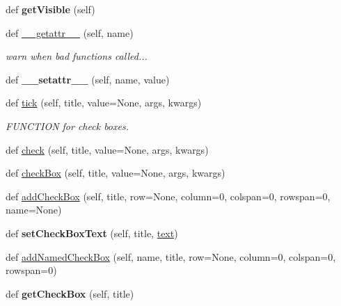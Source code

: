 \begin{DoxyCompactItemize}
def {\bfseries get\+Visible} (self)
\item 
\mbox{\label{classappjar_1_1gui_a11530a350a0664459ecfd79232dd0b71}} 
def \hyperlink{classappjar_1_1gui_a11530a350a0664459ecfd79232dd0b71}{\+\_\+\+\_\+getattr\+\_\+\+\_\+} (self, name)
\begin{DoxyCompactList}\small\item\em warn when bad functions called... \end{DoxyCompactList}\item 
\mbox{\label{classappjar_1_1gui_a2d578292be8d14f1d11415e1548fec39}} 
def {\bfseries \+\_\+\+\_\+setattr\+\_\+\+\_\+} (self, name, value)
\item 
def \hyperlink{classappjar_1_1gui_ab98fbb5e6c2e23f49a2b6d02927fb347}{tick} (self, title, value=None, args, kwargs)
\begin{DoxyCompactList}\small\item\em F\+U\+N\+C\+T\+I\+ON for check boxes. \end{DoxyCompactList}\item 
def \hyperlink{classappjar_1_1gui_a19ebba5d0f738981a6d3210a88d20dbc}{check} (self, title, value=None, args, kwargs)
\item 
def \hyperlink{classappjar_1_1gui_a88b585699e7e9d95175900d31961112d}{check\+Box} (self, title, value=None, args, kwargs)
\item 
def \hyperlink{classappjar_1_1gui_a65dadc504c218227cf826fccaa795b89}{add\+Check\+Box} (self, title, row=None, column=0, colspan=0, rowspan=0, name=None)
\item 
\mbox{\label{classappjar_1_1gui_a0a94a7366ee08f746bfc0ee79fa28414}} 
def {\bfseries set\+Check\+Box\+Text} (self, title, \hyperlink{classappjar_1_1gui_a221b516425bf76dd8560ec9f4818182f}{text})
\item 
def \hyperlink{classappjar_1_1gui_ac86a2fb6536349361c989bb826df2a57}{add\+Named\+Check\+Box} (self, name, title, row=None, column=0, colspan=0, rowspan=0)
\item 
\mbox{\label{classappjar_1_1gui_a1c08bb4ed7a20a9a540ac7ce370eb236}} 
def {\bfseries get\+Check\+Box} (self, title)
\item 
\mbox{\label{classappjar_1_1gui_a84082cfc7ac8c53e2986013cf80f95e2}} 

\end{DoxyCompactItemize}
